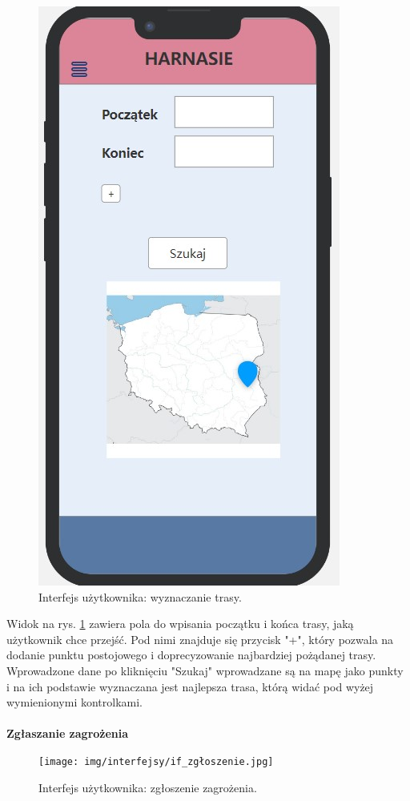    \begin{figure}[H]
        \centering
        \includegraphics[scale=0.5]{img/interfejsy/if_wyznacz.jpg}
        \caption{Interfejs użytkownika: wyznaczanie trasy.}
        \label{interfejs:wyznacz}
    \end{figure}
   Widok na rys. \ref{interfejs:wyznacz} zawiera pola do wpisania początku i końca trasy, jaką użytkownik chce przejść. Pod nimi znajduje się przycisk "+", który pozwala na dodanie punktu postojowego i doprecyzowanie najbardziej pożądanej trasy. Wprowadzone dane po kliknięciu "Szukaj" wprowadzane są na mapę jako punkty i na ich podstawie wyznaczana jest najlepsza trasa, którą widać pod wyżej wymienionymi kontrolkami. \\
   \\
   \textbf{Zgłaszanie zagrożenia}
    \begin{figure}[H]
        \centering
        \texttt{[image: img/interfejsy/if\_zgłoszenie.jpg]}
        \caption{Interfejs użytkownika: zgłoszenie zagrożenia.}
        \label{interfejs:zglos}
    \end{figure}
